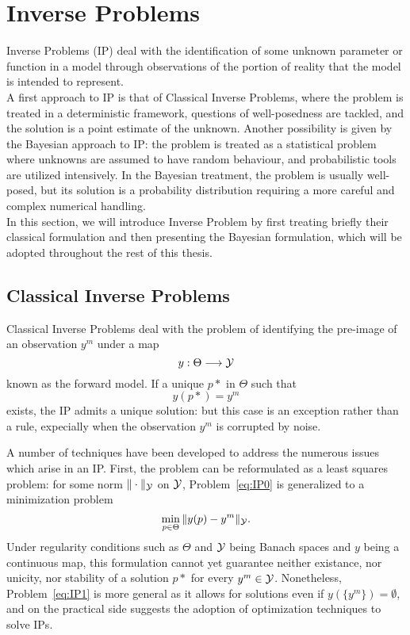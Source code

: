 \section{Inverse Problems} \label{sec:IP}
Inverse Problems (IP) deal with the identification of some unknown parameter or function in a model through observations of the portion of reality that the model is intended to represent. \\
A first approach to IP is that of Classical Inverse Problems, where the problem is treated in a deterministic framework, questions of well-posedness are tackled, and the solution is a point estimate of the unknown.
Another possibility is given by the Bayesian approach to IP: the problem is treated as a statistical problem where unknowns are assumed to have random behaviour, and probabilistic tools are utilized intensively. 
In the Bayesian treatment, the problem is usually well-posed, but its solution is a probability distribution requiring a more careful and complex numerical handling.\\
In this section, we will introduce Inverse Problem by first treating briefly their classical formulation and then presenting the Bayesian formulation, which will be adopted throughout the rest of this thesis.

\subsection{Classical Inverse Problems}\label{sec:CIP}
Classical Inverse Problems deal with the problem of identifying the pre-image of an observation $y^m$ under a map \[y : \Theta \longrightarrow \mathcal Y \] known as the forward model. 
If a unique $p*$ in $\Theta$ such that
\begin{equation}\label{eq:IP0}
    y(p*) = y^m
\end{equation}
exists, the IP admits a unique solution: but this case is an exception rather than a rule, expecially when the observation $y^m$ is corrupted by noise.

A number of techniques have been developed to address the numerous issues which arise in an IP.
First, the problem can be reformulated as a least squares problem: for some norm $\| \cdot \| _\mathcal Y$ on $\mathcal Y$, Problem~\ref{eq:IP0} is generalized to a minimization problem
\begin{equation}\label{eq:IP1}
    \min_{p\in \Theta} \| y(p) - y^m \|_\mathcal Y.
\end{equation}
Under regularity conditions such as $\Theta$ and $\mathcal Y$ being Banach spaces and $y$ being a continuous map, this formulation cannot yet guarantee neither existance, nor unicity, nor stability of a solution $p*$ for every $y^m \in \mathcal Y$. Nonetheless, Problem~\ref{eq:IP1} is more general as it allows for solutions even if $y(\{y^m\} )= \emptyset$, and on the practical side suggests the adoption of optimization techniques to solve IPs.

